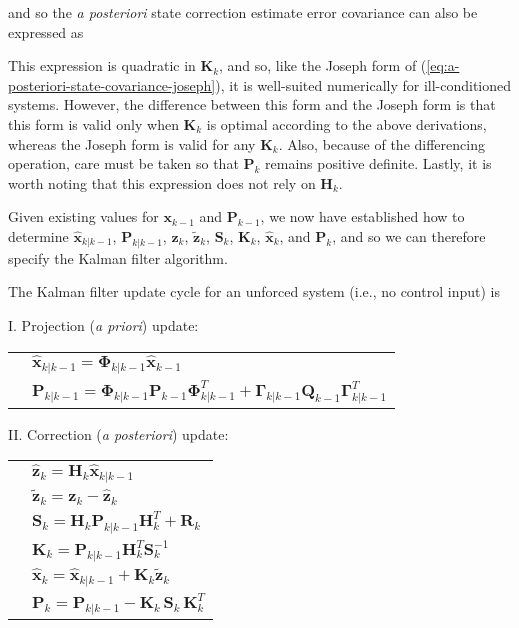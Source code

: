 and so the \textit{a posteriori} state correction estimate error covariance can also be expressed as


This expression is quadratic in $\mathbf{K}_k$, and so, like the Joseph form of
(\ref{eq:a-posteriori-state-covariance-joseph}), it is well-suited numerically for
ill-conditioned systems. However, the difference between this form and the Joseph form
is that this form is valid only when $\mathbf{K}_k$ is optimal according to the above
derivations, whereas the Joseph form is valid for any $\mathbf{K}_k$. Also, because of
the differencing operation, care must be taken so that $\mathbf{P}_k$ remains positive
definite. Lastly, it is worth noting that this expression does not rely on $\mathbf{H}_k$.

Given existing values for $\mathbf{x}_{k-1}$ and $\mathbf{P}_{k-1}$, we now have established
how to determine $\hat{\mathbf{x}}_{k|k-1}$, $\mathbf{P}_{k|k-1}$, $\hat{\mathbf{z}}_{k}$,
$\tilde{\mathbf{z}}_{k}$, $\mathbf{S}_{k}$, $\mathbf{K}_{k}$, $\hat{\mathbf{x}}_k$,
and $\mathbf{P}_k$, and so we can therefore specify the Kalman filter algorithm.

The Kalman filter update cycle for an unforced system (i.e., no control input) is

I. Projection (\textit{a priori}) update:

\begingroup
\renewcommand{\arraystretch}{1.25}
\begin{tabular}{l l}
\phantom{.} & $\hat{\mathbf{x}}_{k|k-1} = \mathbf{\Phi}_{k|k-1} \hat{\mathbf{x}}_{k-1}$ \\
\phantom{.} & $\mathbf{P}_{k|k-1} = \mathbf{\Phi}_{k|k-1} \mathbf{P}_{k-1} \mathbf{\Phi}_{k|k-1}^T + \mathbf{\Gamma}_{k|k-1} \mathbf{Q}_{k-1} \mathbf{\Gamma}_{k|k-1}^T$
\end{tabular}
\endgroup

II. Correction (\textit{a posteriori}) update:

\begingroup
\renewcommand{\arraystretch}{1.25}
\begin{tabular}{l l}
\phantom{.} & $\hat{\mathbf{z}}_k = \mathbf{H}_k \hat{\mathbf{x}}_{k|k-1}$ \\
\phantom{.} & $\tilde{\mathbf{z}}_k = \mathbf{z}_k - \hat{\mathbf{z}}_k$ \\
\phantom{.} & $\mathbf{S}_k = \mathbf{H}_k \mathbf{P}_{k|k-1} \mathbf{H}_k^T + \mathbf{R}_k$ \\
\phantom{.} & $\mathbf{K}_k = \mathbf{P}_{k|k-1} \mathbf{H}_{k}^T \mathbf{S}_k^{-1}$ \\
\phantom{.} & $\hat{\mathbf{x}}_k = \hat{\mathbf{x}}_{k|k-1} +\mathbf{K}_k \tilde{\mathbf{z}}_k$ \\
\phantom{.} & $\mathbf{P}_k = \mathbf{P}_{k|k-1} - \mathbf{K}_{k} \, \mathbf{S}_{k} \, \mathbf{K}_{k}^T$
\end{tabular}
\endgroup

